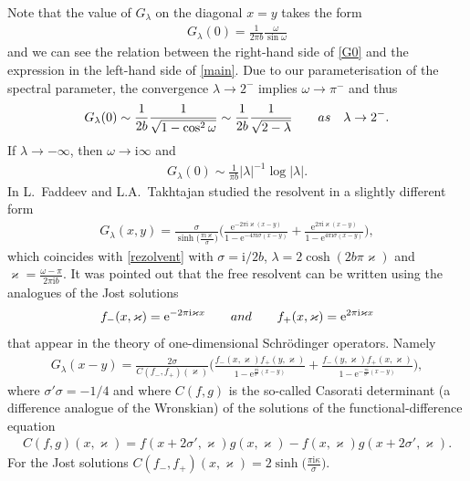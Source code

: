 \documentclass[11pt]{article}
\numberwithin{equation}{section}
\numberwithin{equation}{section}
\newcommand{\e}{\mathrm{e}}
\newcommand{\ii}{\mathrm{i}}
\begin{document}
Note that the value of $G_\lambda$ on the diagonal $x=y$ takes the form
\begin{gather}\label{G0}
G_\lambda(0)=\frac{1}{2\pi b}\frac{\omega}{\sin\omega}
\end{gather}
and we can see the relation between the right-hand side of \eqref{G0} and the expression in the left-hand side of \eqref{main}.
Due to our parameterisation of the spectral parameter, the convergence $\lambda\to 2^-$ implies $\omega\to \pi^-$ and thus
\begin{gather*}
G_\lambda(0) \sim \frac{1}{2b} \frac{1}{\sqrt{1-\cos^2\omega}} \sim \frac{1}{2b} \frac{1}{\sqrt{2-\lambda}}
\qquad {\rm as} \quad \lambda\to 2^-.
\end{gather*}
If $\lambda\to-\infty$, then $\omega \to \ii\infty$ and
\begin{gather*}
G_\lambda(0) \sim \frac{1}{\pi b} |\lambda|^{-1} \log |\lambda|.
\end{gather*}
In \cite{FT2} L.~Faddeev and L.A.~Takhtajan studied the resolvent in a slightly different form
\begin{gather*}
G_\lambda(x,y) = \frac{\sigma}{\sinh \big(\frac{\pi \ii \varkappa}{\sigma}\big) } \bigg( \frac{\e^{-2\pi \ii \varkappa(x-y)}}{1-\e^{- 4 \pi \ii \sigma (x-y)}} +
\frac{\e^{2\pi \ii \varkappa(x-y)}}{1-\e^{4 \pi \ii \sigma (x-y)}} \bigg),
\end{gather*}
which coincides with \eqref{rezolvent} with $\sigma = \ii/2b$, $\lambda = 2\cosh(2b\pi\varkappa)$ and $\varkappa = \frac{\omega - \pi}{2\pi \ii b}$.
It was pointed out that the free resolvent can be written using the analogues of the Jost solutions
\begin{gather*}
f_-(x,\varkappa) = \e^{-2\pi \ii \varkappa x} \qquad {\rm and} \qquad f_+(x,\varkappa) = \e^{2\pi \ii \varkappa x}
\end{gather*}
that appear in the theory of one-dimensional Schr\"odinger operators. Namely
\begin{gather*}
G_\lambda(x-y) = \frac{2\sigma}{C(f_-,f_+)(\varkappa)}
\bigg(\frac{f_-(x, \varkappa) f_+(y, \varkappa)}{1 - \e^{\frac{\pi \ii}{\sigma'} (x-y)}} +
\frac{f_-(y, \varkappa) f_+(x, \varkappa)}{1 - \e^{-\frac{\pi \ii}{\sigma'} (x-y)}} \bigg),
\end{gather*}
where $\sigma' \sigma = -1/4$ and where $C(f,g)$ is the so-called Casorati determinant (a difference analogue of the Wronskian) of the solutions of the functional-difference equation
\begin{gather*}
C(f,g)(x,\varkappa) = f(x+ 2\sigma', \varkappa)g(x,\varkappa) - f(x,\varkappa) g(x + 2\sigma', \varkappa).
\end{gather*}
For the Jost solutions $C(f_-,f_+)(x,\varkappa) = 2\sinh\big(\frac{\pi \ii\kappa}{\sigma}\big)$.
\end{document}

